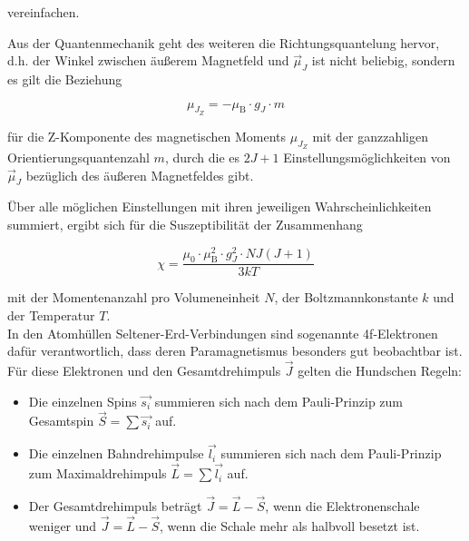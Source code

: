 vereinfachen.

Aus der Quantenmechanik geht des weiteren die Richtungsquantelung hervor, d.h.
der Winkel zwischen äußerem Magnetfeld und $\vec{\mu}_J$ ist nicht beliebig,
sondern es gilt die Beziehung 

\begin{equation}
    \mu_{J_Z} = - \mu_\text{B} \cdot g_J \cdot m
\end{equation}

für die Z-Komponente des magnetischen Moments $\mu_{J_Z}$ mit der ganzzahligen 
Orientierungsquantenzahl $m$, durch die es $2J+1$ Einstellungsmöglichkeiten
von $\vec{\mu}_J$ bezüglich des äußeren Magnetfeldes gibt. 

Über alle möglichen Einstellungen mit ihren jeweiligen Wahrscheinlichkeiten summiert,
ergibt sich für die Suszeptibilität der Zusammenhang

\begin{equation}
    \chi = \frac{\mu_0 \cdot \mu_\text{B}^2 \cdot g_J^2 \cdot N J (J+1)}{3kT}
    \label{eqn:theo}
\end{equation}

mit der Momentenanzahl pro Volumeneinheit $N$, der Boltzmannkonstante $k$ und der
Temperatur $T$.\\

In den Atomhüllen Seltener-Erd-Verbindungen sind sogenannte 4f-Elektronen dafür verantwortlich,
dass deren Paramagnetismus besonders gut beobachtbar ist. Für diese Elektronen und
den Gesamtdrehimpuls $\vec{J}$ gelten die Hundschen Regeln:

\begin{itemize}
    \item Die einzelnen Spins $\vec{s_i}$ summieren sich nach dem Pauli-Prinzip zum Gesamtspin
    $\vec{S} = \sum \vec{s_i}$ auf.
    \item Die einzelnen Bahndrehimpulse $\vec{l_i}$ summieren sich nach dem Pauli-Prinzip zum Maximaldrehimpuls 
    $\vec{L} = \sum \vec{l_i}$ auf.
    \item Der Gesamtdrehimpuls beträgt $\vec{J} = \vec{L} - \vec{S}$, wenn die Elektronenschale weniger und
    $\vec{J} = \vec{L} - \vec{S}$, wenn die Schale mehr als halbvoll besetzt ist.
\end{itemize}





















